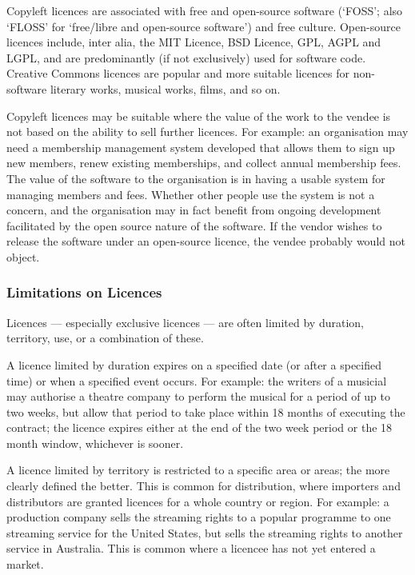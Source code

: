 \documentclass[a4paper,12pt]{article}
\begin{document}
Copyleft licences are associated with free and open-source software (`FOSS'; also `FLOSS' for `free/libre and open-source software') and free culture. Open-source licences include, inter alia, the MIT Licence, BSD Licence, GPL, AGPL and LGPL, and are predominantly (if not exclusively) used for software code. Creative Commons licences are popular and more suitable licences for non-software literary works, musical works, films, and so on.

Copyleft licences may be suitable where the value of the work to the vendee is not based on the ability to sell further licences. For example: an organisation may need a membership management system developed that allows them to sign up new members, renew existing memberships, and collect annual membership fees. The value of the software to the organisation is in having a usable system for managing members and fees. Whether other people use the system is not a concern, and the organisation may in fact benefit from ongoing development facilitated by the open source nature of the software. If the vendor wishes to release the software under an open-source licence, the vendee probably would not object.

\subsubsection{Limitations on Licences}

Licences --- especially exclusive licences --- are often limited by duration, territory, use, or a combination of these.

A licence limited by duration expires on a specified date (or after a specified time) or when a specified event occurs. For example: the writers of a musicial may authorise a theatre company to perform the musical for a period of up to two weeks, but allow that period to take place within 18 months of executing the contract; the licence expires either at the end of the two week period or the 18 month window, whichever is sooner.

A licence limited by territory is restricted to a specific area or areas; the more clearly defined the better. This is common for distribution, where importers and distributors are granted licences for a whole country or region. For example: a production company sells the streaming rights to a popular programme to one streaming service for the United States, but sells the streaming rights to another service in Australia. This is common where a licencee has not yet entered a market.
\end{document}
